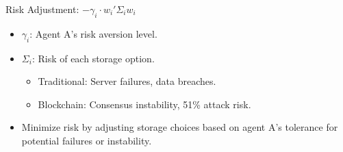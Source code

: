 \documentclass[aspectratio=169]{beamer}
\begin{document}
\begin{frame}{Risk Adjustment: \( - \gamma_i \cdot w_i' \Sigma_i w_i \)}
    \begin{itemize}
        \item \( \gamma_i \): Agent A's risk aversion level.
        \item \( \Sigma_i \): Risk of each storage option.
        \begin{itemize}
            \item Traditional: Server failures, data breaches.
            \item Blockchain: Consensus instability, 51\% attack risk.
        \end{itemize}
        \item Minimize risk by adjusting storage choices based on agent A's tolerance for potential failures or instability.
    \end{itemize}
\end{frame}
\end{document}
